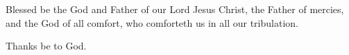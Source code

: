 
Blessed be the God and Father of our Lord Jesus Christ, the Father of mercies, and the God of all comfort, who comforteth us in all our tribulation.

\rubric{\Rbar}Thanks be to God.